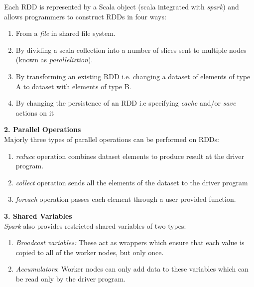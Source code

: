 \documentclass[12pt, a4paper]{article}
\begin{document}
Each RDD is represented by a Scala object (scala integrated with \textit{spark}\cite{Zaharia:2010:SCC:1863103.1863113}) and allows programmers to construct RDDs in four ways:
\begin{enumerate}
    \item From a \textit{file} in shared file system.

    \item By dividing a scala collection into a number of slices sent to multiple nodes (known as \textit{paralleliztion}).
    
    \item By transforming an existing RDD i.e. changing a dataset of elements of type A to dataset with elements of type B.
    
    \item By changing the persistence of an RDD i.e specifying \textit{cache} and/or \textit{save} actions on it
\end{enumerate}

\textbf{2. Parallel Operations}\\
Majorly three types of parallel operations can be performed on RDDs:
\begin{enumerate}
    \item \textit{reduce} operation combines dataset elements to produce result at the driver program.
    
    \item \textit{collect} operation sends all the elements of the dataset to the driver program
    
    \item \textit{foreach} operation passes each element through a user provided function.
\end{enumerate}

\textbf{3. Shared Variables}\\
\textit{Spark}\cite{Zaharia:2010:SCC:1863103.1863113} also provides restricted shared variables of two types:

\begin{enumerate}    
    \item \textit{Broadcast variables:} These act as wrappers which ensure that each value is copied to all of the worker nodes, but only once.
    
    \item \textit{Accumulators}: Worker nodes can only add data to these variables which can be read only by the driver program.
\end{enumerate}
\end{document}
